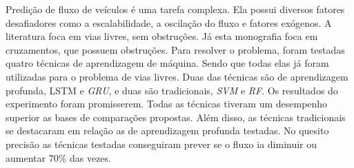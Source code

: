 Predição de fluxo de veículos é uma tarefa complexa. Ela possui diversos fatores desafiadores como a escalabilidade, a oscilação do fluxo e fatores exógenos. A literatura foca em vias livres, sem obstruções. Já esta monografia foca em cruzamentos, que possuem obstruções. Para resolver o problema, foram testadas quatro técnicas de aprendizagem de máquina. Sendo que todas elas já foram utilizadas para o problema de vias livres. Duas das técnicas são de aprendizagem profunda, \acrfull{LSTM} e \textit{\acrfull{GRU}}, e duas são tradicionais, \textit{\acrfull{SVM}} e \textit{\acrfull{RF}}. Os resultados do experimento foram promisserem. Todas as técnicas tiveram um desempenho superior as bases de comparações propostas. Além disso, as técnicas tradicionais se destacaram em relação as de aprendizagem profunda testadas. No quesito precisão as técnicas testadas conseguiram prever se o fluxo ia diminuir ou aumentar 70\% das vezes.